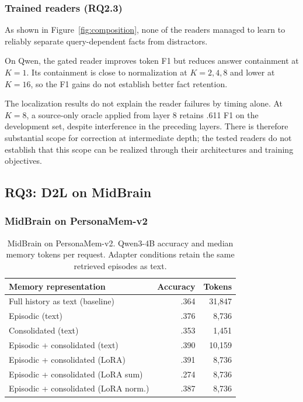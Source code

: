 \subsubsection{Trained readers (RQ2.3)}
\label{sec:res-readers}
As shown in Figure~\ref{fig:composition}, none of the readers managed to learn
to reliably separate query-dependent facts from distractors.

On Qwen, the gated reader improves token F1 but reduces answer containment
at $K=1$. Its containment is close to normalization at $K=2,4,8$ and lower
at $K=16$, so the F1 gains do not establish better fact retention.

The localization results do not explain the reader failures by timing alone.
At $K=8$, a source-only oracle applied from layer 8 retains .611 F1 on the
development set, despite interference in the preceding layers. There is
therefore substantial scope for correction at intermediate depth; the tested
readers do not establish that this scope can be realized through their
architectures and training objectives.

\subsection{RQ3: D2L on MidBrain}
\label{sec:res-delivers}

\subsubsection{MidBrain on PersonaMem-v2}
\begin{table}[t]
\centering
\caption{MidBrain on PersonaMem-v2. Qwen3-4B accuracy and median memory
tokens per request. Adapter conditions retain the same retrieved episodes as text.}
\label{tab:user-memory-summary}
\small\setlength{\tabcolsep}{3pt}
\begin{tabular}{@{}lrr@{}}
\toprule
Memory representation & Accuracy & Tokens \\
\midrule
Full history as text (baseline) & .364 & 31{,}847 \\
\midrule
Episodic (text) & .376 & 8{,}736 \\
Consolidated (text) & .353 & 1{,}451 \\
Episodic + consolidated (text) & .390 & 10{,}159 \\
Episodic + consolidated (LoRA) & .391 & 8{,}736 \\
Episodic + consolidated (LoRA sum) & .274 & 8{,}736 \\
Episodic + consolidated (LoRA norm.) & .387 & 8{,}736 \\
\bottomrule
\end{tabular}
\end{table}

